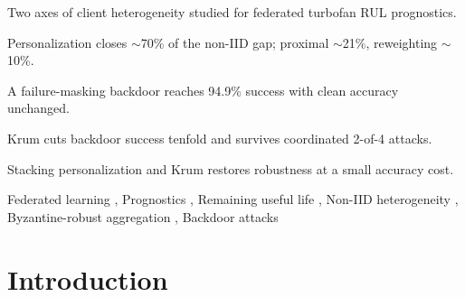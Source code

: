 \documentclass[a4paper,fleqn,doubleblind]{cas-sc}
\begin{document}
\begin{highlights}
\item Two axes of client heterogeneity studied for federated turbofan RUL prognostics.
\item Personalization closes $\sim$70\% of the non-IID gap; proximal $\sim$21\%, reweighting $\sim$10\%.
\item A failure-masking backdoor reaches 94.9\% success with clean accuracy unchanged.
\item Krum cuts backdoor success tenfold and survives coordinated 2-of-4 attacks.
\item Stacking personalization and Krum restores robustness at a small accuracy cost.
\end{highlights}

\begin{keywords}
Federated learning \sep
Prognostics \sep
Remaining useful life \sep
Non-IID heterogeneity \sep
Byzantine-robust aggregation \sep
Backdoor attacks
\end{keywords}

\maketitle


\section{Introduction}
\label{sec:intro}
\end{document}
